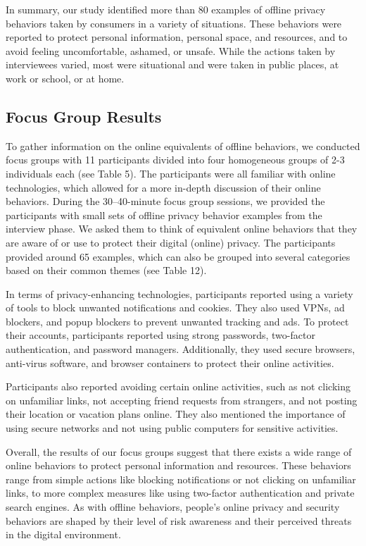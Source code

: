 In summary, our study identified more than 80 examples of offline privacy behaviors taken by consumers in a variety of situations. These behaviors were reported to protect personal information, personal space, and resources, and to avoid feeling uncomfortable, ashamed, or unsafe. While the actions taken by interviewees varied, most were situational and were taken in public places, at work or school, or at home. 

\subsection{Focus Group Results}
\label{Label2}

To gather information on the online equivalents of offline behaviors, we conducted focus groups with 11 participants divided into four homogeneous groups of 2-3 individuals each (see Table 5). The participants were all familiar with online technologies, which allowed for a more in-depth discussion of their online behaviors. 
During the 30–40-minute focus group sessions, we provided the participants with small sets of offline privacy behavior examples from the interview phase. We asked them to think of equivalent online behaviors that they are aware of or use to protect their digital (online) privacy. The participants provided around 65 examples, which can also be grouped into several categories based on their common themes (see Table 12). 

In terms of privacy-enhancing technologies, participants reported using a variety of tools to block unwanted notifications and cookies. They also used VPNs, ad blockers, and popup blockers to prevent unwanted tracking and ads. To protect their accounts, participants reported using strong passwords, two-factor authentication, and password managers. Additionally, they used secure browsers, anti-virus software, and browser containers to protect their online activities. 

Participants also reported avoiding certain online activities, such as not clicking on unfamiliar links, not accepting friend requests from strangers, and not posting their location or vacation plans online. They also mentioned the importance of using secure networks and not using public computers for sensitive activities. 

Overall, the results of our focus groups suggest that there exists a wide range of online behaviors to protect personal information and resources. These behaviors range from simple actions like blocking notifications or not clicking on unfamiliar links, to more complex measures like using two-factor authentication and private search engines. As with offline behaviors, people's online privacy and security behaviors are shaped by their level of risk awareness and their perceived threats in the digital environment. 

